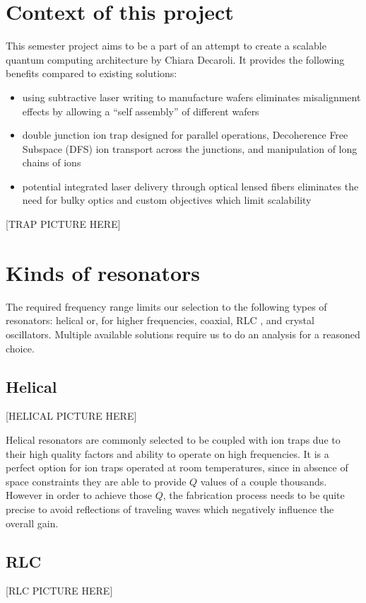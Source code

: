 \section{Context of this project}
\label{sec:context}
This semester project aims to be a part of an attempt to create a scalable quantum computing architecture by Chiara Decaroli. It provides the following benefits compared to existing solutions:
\begin{itemize}
	\item using subtractive laser writing to manufacture wafers eliminates misalignment effects by allowing a ``self assembly'' of different wafers
	\item double junction ion trap designed for parallel operations, Decoherence Free Subspace (DFS) ion transport across the junctions, and manipulation of long chains of ions
	\item potential integrated laser delivery through optical lensed fibers eliminates the need for bulky optics and custom objectives which limit scalability
\end{itemize}

[TRAP PICTURE HERE]

\section{Kinds of resonators}
\label{sec:kinds_resonators}
The required frequency range limits our selection to the following types of resonators: helical \cite{Gulde2017} or, for higher frequencies, coaxial, RLC \cite{Gandolfi2010}, and crystal oscillators. Multiple available solutions require us to do an analysis for a reasoned choice.
\subsection{Helical}
[HELICAL PICTURE HERE]

Helical resonators are commonly selected to be coupled with ion traps due to their high quality factors and ability to operate on high frequencies. It is a perfect option for ion traps operated at room temperatures, since in absence of space constraints they are able to provide $Q$ values of a couple thousands. However in order to achieve those $Q$, the fabrication process needs to be quite precise to avoid reflections of traveling waves which negatively influence the overall gain.
\subsection{RLC}
[RLC PICTURE HERE]

